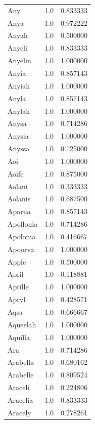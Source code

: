 \documentclass[
  letterpaper,
  DIV=11,
  numbers=noendperiod]{scrreprt}
\begin{document}
\begin{tabular}{lrr}
Any             &   1.0 &   0.833333 \\
Anya            &   1.0 &   0.972222 \\
Anyah           &   1.0 &   0.500000 \\
Anyeli          &   1.0 &   0.833333 \\
Anyelin         &   1.0 &   1.000000 \\
Anyia           &   1.0 &   0.857143 \\
Anyiah          &   1.0 &   1.000000 \\
Anyla           &   1.0 &   0.857143 \\
Anylah          &   1.0 &   1.000000 \\
Anysa           &   1.0 &   0.714286 \\
Anysia          &   1.0 &   1.000000 \\
Anyssa          &   1.0 &   0.125000 \\
Aoi             &   1.0 &   1.000000 \\
Aoife           &   1.0 &   0.875000 \\
Aolani          &   1.0 &   0.333333 \\
Aolanis         &   1.0 &   0.687500 \\
Aparna          &   1.0 &   0.857143 \\
Apollonia       &   1.0 &   0.714286 \\
Apolonia        &   1.0 &   0.416667 \\
Apoorva         &   1.0 &   1.000000 \\
Apple           &   1.0 &   0.500000 \\
April           &   1.0 &   0.118881 \\
Aprille         &   1.0 &   1.000000 \\
Apryl           &   1.0 &   0.428571 \\
Aqsa            &   1.0 &   0.666667 \\
Aqueelah        &   1.0 &   1.000000 \\
Aquilla         &   1.0 &   1.000000 \\
Ara             &   1.0 &   0.714286 \\
Arabella        &   1.0 &   0.680162 \\
Arabelle        &   1.0 &   0.809524 \\
Araceli         &   1.0 &   0.224806 \\
Aracelia        &   1.0 &   0.833333 \\
Aracely         &   1.0 &   0.278261 \\

\end{tabular}
\end{document}
